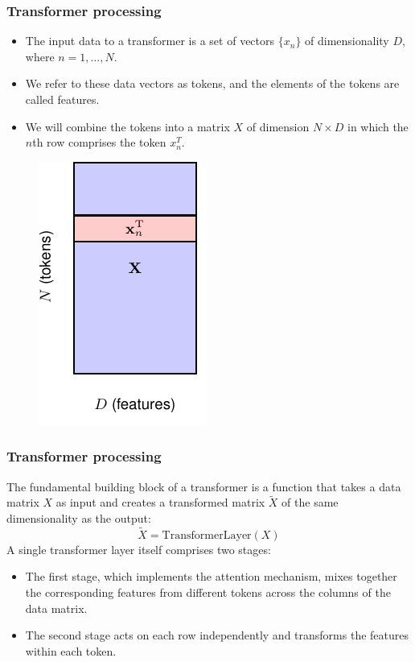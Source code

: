 \documentclass{beamer}
\begin{document}
\begin{frame}
    \frametitle{Transformer processing}
    \begin{itemize}
        \item The input data to a transformer is a set of vectors $\{x_{n}\}$ of dimensionality $D$, where $n=1,\hdots,N$.
        \item We refer to these data vectors as tokens, and the elements of the tokens are called features.
        \item We will combine the tokens into a matrix $X$ of dimension $N\times{}D$ in which the $n$th row comprises the token $x_{n}^{T}$.
    \end{itemize}
    \begin{figure}
        \includegraphics[height=0.4\textheight]{Figure_3.pdf}
    \end{figure}
\end{frame}

\begin{frame}
    \frametitle{Transformer processing}
    The fundamental building block of a transformer is a function that takes a data matrix $X$ as input and creates a transformed matrix $\tilde{X}$ of the same dimensionality as the output:
    \begin{equation*}
        \tilde{X}=\mathrm{TransformerLayer}(X)
    \end{equation*}
    A single transformer layer itself comprises two stages:
    \begin{itemize}
        \item The first stage, which implements the attention mechanism, mixes together the corresponding features from different tokens across the columns of the data matrix.
        \item The second stage acts on each row independently and transforms the features within each token.
    \end{itemize}
\end{frame}
\end{document}
